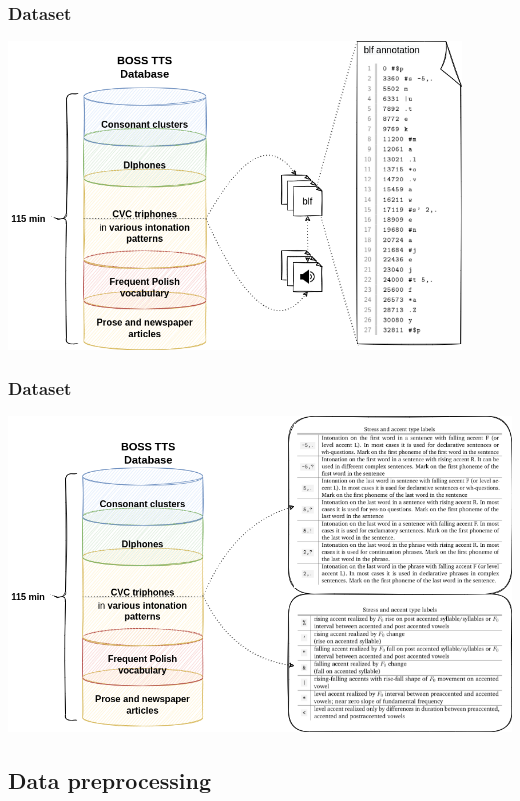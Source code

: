 \documentclass[a4paper,9pt]{beamer}
\theoremstyle{mytheoremstyle}
\begin{document}
\begin{frame}
\frametitle{Dataset}
\begin{center}
  \includegraphics[width=0.9\textwidth]{res/dataset_blf}
\end{center}
\end{frame}


\begin{frame}
\frametitle{Dataset}
\begin{center}
  \includegraphics[width=\textwidth]{res/database_structure_explanation}
\end{center}
\end{frame}

\subsection{Data preprocessing}
\end{document}
